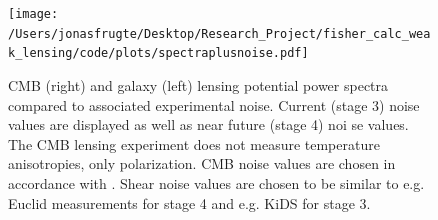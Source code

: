 \documentclass[11pt]{article} %
\begin{document}
\begin{figure}[t]
    \centering
    \texttt{[image: /Users/jonasfrugte/Desktop/Research\_Project/fisher\_calc\_weak\_lensing/code/plots/spectraplusnoise.pdf]}
    \caption{CMB (right) and galaxy (left) lensing potential power spectra compared to associated experimental noise. Current (stage 3) noise values are displayed as well as near future (stage 4) noi se values. The CMB lensing experiment does not measure temperature anisotropies, only polarization. CMB noise values are chosen in accordance with \cite{Namikawa_2016}. Shear noise values are chosen to be similar to e.g. Euclid measurements for stage 4 and e.g. KiDS for stage 3.}
    \label{fig:lpsplusnoise}
\end{figure}







\end{document}
